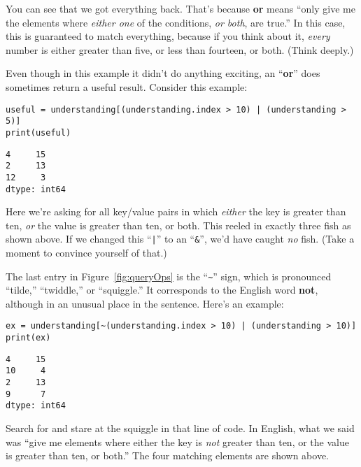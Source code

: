 You can see that we got everything back. That's because \textbf{or} means
``only give me the elements where \textit{either one} of the conditions,
\textit{or both}, are true.'' In this case, this is guaranteed to match
everything, because if you think about it, \textit{every} number is either
greater than five, or less than fourteen, or both. (Think deeply.)

Even though in this example it didn't do anything exciting, an ``\textbf{or}''
does sometimes return a useful result. Consider this example:

\begin{Verbatim}[fontsize=\small,samepage=true,frame=single,framesep=3mm]
useful = understanding[(understanding.index > 10) | (understanding > 5)]
print(useful)
\end{Verbatim}

\begin{Verbatim}[fontsize=\small,samepage=true,frame=leftline,framesep=5mm,framerule=1mm]
4     15
2     13
12     3
dtype: int64
\end{Verbatim}

Here we're asking for all key/value pairs in which \textit{either} the key is
greater than ten, \textit{or} the value is greater than ten, or both. This
reeled in exactly three fish as shown above. If we changed this ``\texttt{|}''
to an ``\texttt{\&}'', we'd have caught \textit{no} fish. (Take a moment to
convince yourself of that.)


The last entry in Figure~\ref{fig:queryOps} is the ``\texttt{\textasciitilde}''
sign, which is pronounced ``tilde,'' ``twiddle,'' or ``squiggle.'' It
corresponds to the English word \textbf{not}, although in an unusual place in
the sentence. Here's an example:

\begin{Verbatim}[fontsize=\small,samepage=true,frame=single,framesep=3mm]
ex = understanding[~(understanding.index > 10) | (understanding > 10)]
print(ex)
\end{Verbatim}

\begin{Verbatim}[fontsize=\small,samepage=true,frame=leftline,framesep=5mm,framerule=1mm]
4     15
10     4
2     13
9      7
dtype: int64
\end{Verbatim}

Search for and stare at the squiggle in that line of code. In English, what we
said was ``give me elements where either the key is \textit{not} greater than
ten, or the value is greater than ten, or both.'' The four matching elements
are shown above. 

